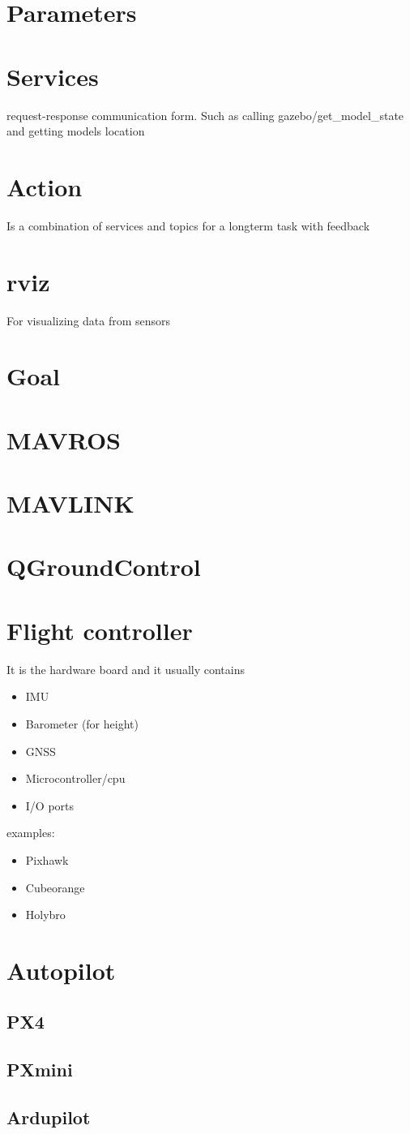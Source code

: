 \section{Parameters}
\section{Services}
    request-response communication form. Such as calling gazebo/get\_model\_state and getting models location
\section{Action}
Is a combination of services and topics for a longterm task with feedback

\section{rviz}
    For visualizing data from sensors

\section{Goal}
\section{MAVROS}
\section{MAVLINK}
\section{QGroundControl}
\section{Flight controller}
    It is the hardware board and it usually contains
    \begin{itemize}
        \item IMU
        \item Barometer (for height)
        \item GNSS
        \item Microcontroller/cpu
        \item I/O ports
    \end{itemize}

    examples:
    \begin{itemize}
        \item Pixhawk
        \item Cubeorange
        \item Holybro
    \end{itemize}

\section{Autopilot}
    \subsection{PX4}
        \subsection{PXmini}
    \subsection{Ardupilot}